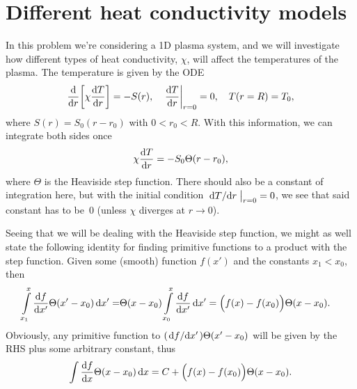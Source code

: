 \documentclass[11pt,a4paper, 
swedish, english %
]{article}
\begin{document}
\section{Different heat conductivity models}
In this problem we're considering a 1D plasma system, and we will
investigate how different types of heat conductivity, $\chi$, will
affect the temperatures of the plasma. The temperature is given by the
ODE
\begin{equation}
\dv{r}\qty[\chi\dv{T}{r}]=-S(r)\qc
\eval{\dv{T}{r}}_{r=0}=0\qc
T(r=R)=T_0,
\end{equation}
where $S(r)=S_0(r-r_0)$ with $0<r_0<R$. With this information, we can
integrate both sides once
\begin{equation}\label{eq2:ODE}
\chi\dv{T}{r}=-S_0\Theta(r-r_0),
\end{equation}
where $\Theta$ is the Heaviside step function. There should also be a
constant of integration here, but with the initial condition
$\eval{\dv*{T}{r}}_{r=0}=0$, we see that said constant has to be~0
(unless $\chi$ diverges at $r\to0$).

Seeing that we will be dealing with the Heaviside step function, we
might as well state the following identity for finding primitive
functions to a product with the step function. Given some (smooth)
function $f(x')$ and the constants $x_1<x_0$, then 
\begin{equation}
\begin{aligned}
\int_{x_1}^{x}\dv{f}{x'}\Theta(x'-x_0)\id{x'}=&
\Theta(x-x_0)\int_{x_0}^{x}\dv{f}{x'}\id{x'}
=\Big(f(x)-f(x_0)\Big)\Theta(x-x_0).
\end{aligned}
\end{equation}
Obviously, any primitive function to $(\dv*{f}{x'})\Theta(x'-x_0)$
will be given by the RHS plus some arbitrary constant, thus
\begin{equation}\label{eq2:heaviside-int}
\int\dv{f}{x}\Theta(x-x_0)\id{x}
=C+\Big(f(x)-f(x_0)\Big)\Theta(x-x_0).
\end{equation}
\end{document}
